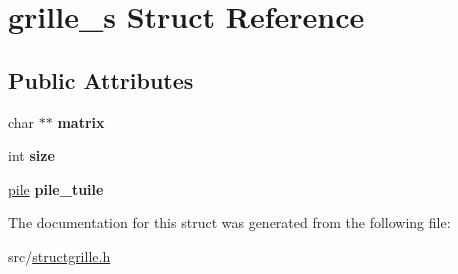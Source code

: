 \hypertarget{structgrille__s}{}\section{grille\+\_\+s Struct Reference}
\label{structgrille__s}
\subsection*{Public Attributes}
\begin{DoxyCompactItemize}
\item 
\mbox{\label{structgrille__s_adb7d4c3b09d1835a386ec6791a251188}} 
char $\ast$$\ast$ {\bfseries matrix}
\item 
\mbox{\label{structgrille__s_a85828f7ea1b281e59c963796a4730430}} 
int {\bfseries size}
\item 
\mbox{\label{structgrille__s_a495594923d26abd395bd749ee37946b7}} 
\hyperlink{structpile}{pile} {\bfseries pile\+\_\+tuile}
\end{DoxyCompactItemize}


The documentation for this struct was generated from the following file\+:\begin{DoxyCompactItemize}
\item 
src/\hyperlink{structgrille_8h}{structgrille.\+h}\end{DoxyCompactItemize}
